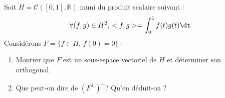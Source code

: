 \documentclass[a4paper,10pt]{report}
\begin{document}

\begin{Exa}[\ding{80}] Soit $H= \mathcal{C}([0,1],\mathbb{R})$ muni du produit scalaire suivant :
$$ \forall (f,g) \in H^2, \, <f,g> = \int_{0}^1 f(t) g(t) \dt $$
Considérons $F= \lbrace f \in H, \, f(0)=0 \rbrace \cdot$

\begin{enumerate}
\item Montrer que $F$ est un sous-espace vectoriel de $H$ et déterminer son orthogonal.
\item Que peut-on dire de $(F^{\perp})^{\perp}$? Qu'en déduit-on ?
\end{enumerate}
\end{Exa}
\end{document}

